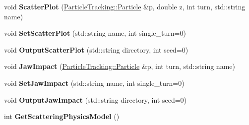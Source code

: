 \begin{DoxyCompactItemize}
void {\bfseries Scatter\+Plot} (\hyperlink{classPSvector}{Particle\+Tracking\+::\+Particle} \&p, double z, int turn, std\+::string name)
\item 
\mbox{\label{classCollimation_1_1ScatteringModel_a8be5a13d6a070fa2cec17371012a02dd}} 
void {\bfseries Set\+Scatter\+Plot} (std\+::string name, int single\+\_\+turn=0)
\item 
\mbox{\label{classCollimation_1_1ScatteringModel_accb6dd3b9b69ae4990030ef9e5160e1e}} 
void {\bfseries Output\+Scatter\+Plot} (std\+::string directory, int seed=0)
\item 
\mbox{\label{classCollimation_1_1ScatteringModel_a252b20da3d6da6edf6ec914518fbbf2a}} 
void {\bfseries Jaw\+Impact} (\hyperlink{classPSvector}{Particle\+Tracking\+::\+Particle} \&p, int turn, std\+::string name)
\item 
\mbox{\label{classCollimation_1_1ScatteringModel_a8aaa0f301ab975acbd0fdea1c0429f45}} 
void {\bfseries Set\+Jaw\+Impact} (std\+::string name, int single\+\_\+turn=0)
\item 
\mbox{\label{classCollimation_1_1ScatteringModel_a879816da386807aefd1e1af353e29340}} 
void {\bfseries Output\+Jaw\+Impact} (std\+::string directory, int seed=0)
\item 
\mbox{\label{classCollimation_1_1ScatteringModel_acd2f8d82c9169a5b38a48fa3b5dc1be3}} 
int {\bfseries Get\+Scattering\+Physics\+Model} ()
\end{DoxyCompactItemize}
